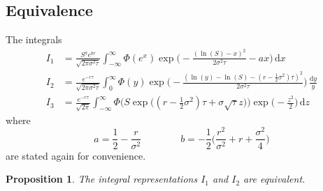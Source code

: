 \documentclass[12pt]{article}
\newtheorem{proposition}[lemma]{Proposition}
\theoremstyle{definition}
\theoremstyle{remark}
\begin{document}
\subsection{Equivalence}
The integrals
\begin{align*}
	I_1 &= \frac{S^a e^{b\tau}}{\sqrt{2\pi \sigma^2 \tau}} \int_{-\infty}^{\infty} \Phi(e^x) \exp \Big( -\frac{(\ln (S)-x)^2}{2\sigma^2 \tau} - ax \Big) \,\mathrm{d}x \\
	I_2 &= \frac{e^{-r\tau}}{\sqrt{2\pi\sigma^2\tau}} \int_0^\infty \Phi(y) \exp \Big( -\frac{\left(\ln (y) - \ln (S) - (r-\tfrac12\sigma^2)\tau\right)^2} {2\sigma^2 \tau} \Big) \, \frac{\mathrm{d}y}{y} \\
	I_3 &= \frac{e^{-r\tau}}{\sqrt{2\pi}} \int_{-\infty}^{\infty} \Phi \Big( S \exp \big((r-\frac12\sigma^2)\tau + \sigma\sqrt{\tau} z\big) \Big) \exp \Big( -\frac{z^2}{2} \Big) \,\mathrm{d} z
\end{align*}
where
$$
a = \frac{1}{2} - \frac{r}{\sigma^2}
\qquad\qquad
b = -\frac{1}{2} \Big( \frac{r^2}{\sigma^2} + r + \frac{\sigma^2}{4} \Big)
$$
are stated again for convenience.
\begin{proposition}
\label{prop: i1 i2}
	The integral representations $I_1$ and $I_2$ are equivalent.
\end{proposition}
\end{document}
